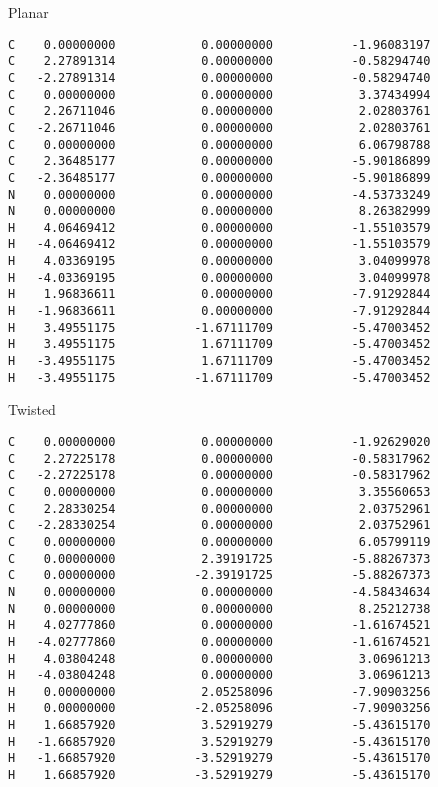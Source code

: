 \documentclass[journal=jctcce,manuscript=article,layout=traditional]{achemso}
\begin{document}
\begin{singlespace}
\noindent Planar
\begin{verbatim}
C    0.00000000            0.00000000           -1.96083197
C    2.27891314            0.00000000           -0.58294740
C   -2.27891314            0.00000000           -0.58294740
C    0.00000000            0.00000000            3.37434994
C    2.26711046            0.00000000            2.02803761
C   -2.26711046            0.00000000            2.02803761
C    0.00000000            0.00000000            6.06798788
C    2.36485177            0.00000000           -5.90186899
C   -2.36485177            0.00000000           -5.90186899
N    0.00000000            0.00000000           -4.53733249
N    0.00000000            0.00000000            8.26382999
H    4.06469412            0.00000000           -1.55103579
H   -4.06469412            0.00000000           -1.55103579
H    4.03369195            0.00000000            3.04099978
H   -4.03369195            0.00000000            3.04099978
H    1.96836611            0.00000000           -7.91292844
H   -1.96836611            0.00000000           -7.91292844
H    3.49551175           -1.67111709           -5.47003452
H    3.49551175            1.67111709           -5.47003452
H   -3.49551175            1.67111709           -5.47003452
H   -3.49551175           -1.67111709           -5.47003452
\end{verbatim}
\end{singlespace}

\begin{singlespace}
\noindent Twisted
\begin{verbatim}
C    0.00000000            0.00000000           -1.92629020
C    2.27225178            0.00000000           -0.58317962
C   -2.27225178            0.00000000           -0.58317962
C    0.00000000            0.00000000            3.35560653
C    2.28330254            0.00000000            2.03752961
C   -2.28330254            0.00000000            2.03752961
C    0.00000000            0.00000000            6.05799119
C    0.00000000            2.39191725           -5.88267373
C    0.00000000           -2.39191725           -5.88267373
N    0.00000000            0.00000000           -4.58434634
N    0.00000000            0.00000000            8.25212738
H    4.02777860            0.00000000           -1.61674521
H   -4.02777860            0.00000000           -1.61674521
H    4.03804248            0.00000000            3.06961213
H   -4.03804248            0.00000000            3.06961213
H    0.00000000            2.05258096           -7.90903256
H    0.00000000           -2.05258096           -7.90903256
H    1.66857920            3.52919279           -5.43615170
H   -1.66857920            3.52919279           -5.43615170
H   -1.66857920           -3.52919279           -5.43615170
H    1.66857920           -3.52919279           -5.43615170
\end{verbatim}
\end{singlespace}
\end{document}
